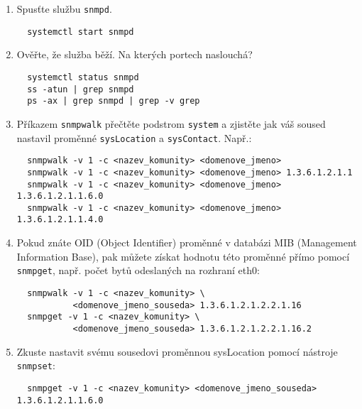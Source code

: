 \begin{itemize}
\begin{enumerate}
\begin{enumerate}
{           localhost}
           \item V konfiguračním souboru ještě nastavte SNMP proměnnou \texttt{sysContact}
           na Vámi vymyšlenou hodnotu. Takto nastaven8 proměnná bude vždy pouze pro čtení bez ohledu
           na nastavení přístupových pravidel.
           \item Nastavte proměnnou sysLocation pomocí příkazu {\tt snmpset}
\begin{verbatim}
  snmpset -v1 -c <nazev_komunity> localhost 1.3.6.1.2.1.1.6.0 s <retezec>
\end{verbatim}
           \end{enumerate}
            \item Spusťte službu {\tt snmpd}.
\begin{verbatim}
  systemctl start snmpd
\end{verbatim} 
            \item Ověřte, že služba běží. Na kterých portech naslouchá?
\begin{verbatim}
  systemctl status snmpd
  ss -atun | grep snmpd
  ps -ax | grep snmpd | grep -v grep
\end{verbatim} 
          \item Příkazem {\tt snmpwalk} přečtěte podstrom {\tt system} a zjistěte jak váš
          soused nastavil proměnné {\tt sysLocation} a {\tt sysContact}. Např.:
\begin{verbatim}
  snmpwalk -v 1 -c <nazev_komunity> <domenove_jmeno>
  snmpwalk -v 1 -c <nazev_komunity> <domenove_jmeno> 1.3.6.1.2.1.1
  snmpwalk -v 1 -c <nazev_komunity> <domenove_jmeno> 1.3.6.1.2.1.1.6.0
  snmpwalk -v 1 -c <nazev_komunity> <domenove_jmeno> 1.3.6.1.2.1.1.4.0
\end{verbatim}

          \item Pokud znáte OID (Object Identifier) proměnné v databázi MIB (Management Information Base), pak
          můžete získat hodnotu této proměnné
          přímo pomocí {\tt snmpget}, např. počet bytů odeslaných na rozhraní eth0:
\begin{verbatim}
  snmpwalk -v 1 -c <nazev_komunity> \
           <domenove_jmeno_souseda> 1.3.6.1.2.1.2.2.1.16
  snmpget -v 1 -c <nazev_komunity> \
           <domenove_jmeno_souseda> 1.3.6.1.2.1.2.2.1.16.2
\end{verbatim}
          \item Zkuste nastavit svému sousedovi proměnnou sysLocation
          pomocí nástroje {\tt snmpset}:
\begin{verbatim}
  snmpget -v 1 -c <nazev_komunity> <domenove_jmeno_souseda> 1.3.6.1.2.1.1.6.0


\end{verbatim}
\end{enumerate}
\end{itemize}
